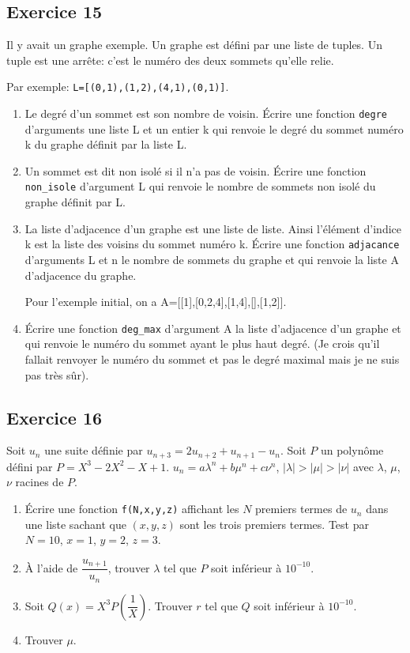 \documentclass[10pt,fleqn]{article} %
\begin{document}
\begin{multicols}{2}
\subsection*{Exercice 15}

Il y avait un graphe exemple. Un graphe est défini par une liste de tuples. Un tuple est une arrête: c'est le numéro des deux sommets qu'elle relie.

Par exemple: \texttt{L=[(0,1),(1,2),(4,1),(0,1)]}.

\begin{enumerate}
\item Le degré d'un sommet est son nombre de voisin. Écrire une fonction \texttt{degre} d'arguments une liste L et un entier k qui renvoie le degré du sommet numéro k du graphe définit par la liste L.
\item Un sommet est dit non isolé si il n'a pas de voisin. Écrire une fonction \texttt{non\_isole} d'argument L qui renvoie le nombre de sommets non isolé du graphe définit par L.
\item La liste d'adjacence d'un graphe est une liste de liste. Ainsi l'élément d'indice k est la liste des voisins du sommet numéro k.
Écrire une fonction \texttt{adjacance} d'arguments L et n le nombre de sommets du graphe et qui renvoie la liste A d'adjacence du graphe.

Pour l'exemple initial, on a A=[[1],[0,2,4],[1,4],[],[1,2]].

\item Écrire une fonction \texttt{deg\_max} d'argument A la liste d'adjacence d'un graphe et qui renvoie le numéro du sommet ayant le plus haut degré. (Je crois qu'il fallait renvoyer le numéro du sommet et pas le degré maximal mais je ne suis pas très sûr).
\end{enumerate}

\subsection*{Exercice 16}

Soit $u_n$ une suite définie par $u_{n+3}=2u_{n+2}+u_{n+1} - u_n$. Soit $P$ un polynôme défini par $P=X^3-2X^2-X+1$. $u_n=a\lambda^n+b\mu^n+ c\nu ^n$, $|\lambda|>|\mu|>|\nu|$ avec $\lambda$, $\mu$, $\nu$ racines de $P$.
\begin{enumerate}
\item Écrire une fonction \texttt{f(N,x,y,z)} affichant les $N$ premiers termes de $u_n$ dans une liste sachant que $(x,y,z)$ sont les trois premiers termes. Test par $N=10$, $x=1$, $y=2$, $z=3$.
\item À l'aide de $\dfrac{u_{n+1}}{u_n}$, trouver $\lambda$ tel que $P$ soit inférieur à $10^{-10}$.
\item Soit $Q(x)=X^3P\left(\dfrac{1}{X}\right)$. Trouver $r$ tel que $Q$ soit inférieur à $10^{-10}$.
\item Trouver $\mu$.
\end{enumerate}


\end{multicols}
\end{document}
